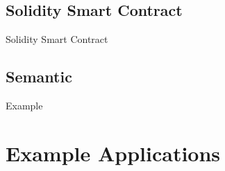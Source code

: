 \documentclass[aspectratio=169]{beamer}
\makeatletter
\def\blfootnote{\gdef\@thefnmark{}\@footnotetext}
\makeatother
\begin{document}
\subsection{Solidity Smart Contract}

\begin{frame}{Solidity Smart Contract}



\end{frame}

\subsection{Semantic}

\begin{frame}[fragile]{Example}
	
\end{frame}

\section{Example Applications}
\frame{\tableofcontents[currentsection]}
\end{document}
